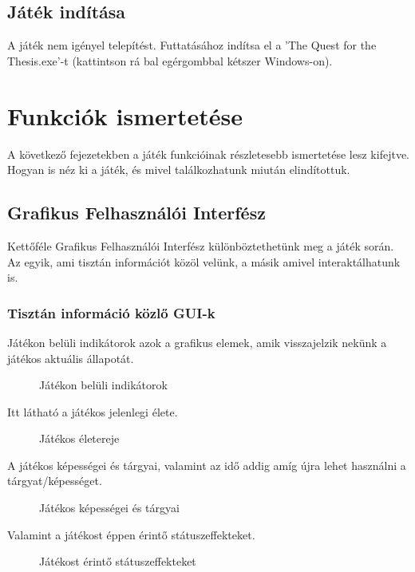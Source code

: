 \subsection{Játék indítása}
A játék nem igényel telepítést. Futtatásához indítsa el a 'The Quest for the Thesis.exe'-t (kattintson rá bal egérgombbal kétszer Windows-on).

\newpage
\section{Funkciók ismertetése}
A következő fejezetekben a játék funkcióinak részletesebb ismertetése lesz kifejtve. Hogyan is néz ki a játék, és mivel találkozhatunk miután elindítottuk.

\subsection{Grafikus Felhasználói Interfész}
Kettőféle Grafikus Felhasználói Interfész különböztethetünk meg a játék során. Az egyik, ami tisztán információt közöl velünk, a másik amivel interaktálhatunk is.
\subsubsection{Tisztán információ közlő GUI-k}
Játékon belüli indikátorok azok a grafikus elemek, amik visszajelzik nekünk a játékos aktuális állapotát. 
\begin{figure}[htb]
	\noindent{}
	\caption{Játékon belüli indikátorok}
	\label{inUse}
\end{figure}

Itt látható a játékos jelenlegi élete.
\begin{figure}[htb]
	\noindent{}
	\caption{Játékos életereje}
	\label{inUseHealth}
\end{figure}

A játékos képességei és tárgyai, valamint az idő addig amíg újra lehet használni a tárgyat/képességet.
\begin{figure}[htb]
	\noindent{}
	\caption{Játékos képességei és tárgyai}
	\label{inUseItems}
\end{figure}

Valamint a játékost éppen érintő státuszeffekteket.
\begin{figure}[htb]
	\noindent{}
	\caption{Játékost érintő státuszeffekteket}
	\label{inUseStatuses}
\end{figure}

